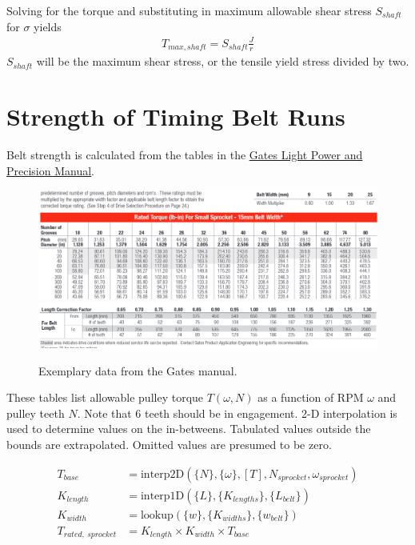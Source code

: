 \documentclass[10pt,letterpaper]{article}
\begin{document}
	Solving for the torque and substituting in maximum allowable shear stress $S_{shaft}$ for $\sigma$ yields
	\begin{align}
		T_{max,shaft} = S_{shaft} \frac{J}{r}
	\end{align}
	$S_{shaft}$ will be the maximum shear stress, or the tensile yield stress divided by two.

\section{Strength of Timing Belt Runs}
	Belt strength is calculated from the tables in the \href{https://www.gates.com/content/dam/gates/home/resources/resource-library/catalogs/light-power-and-precision-manual.pdf}{\underline{Gates Light Power and Precision Manual}}.

	\begin{figure}[H]
	\includegraphics[width=\textwidth]{beltrating_a.png}
	\includegraphics[width=\textwidth]{beltrating_b.png}
	\caption{Exemplary data from the Gates manual.}
	\end{figure}

	These tables list allowable pulley torque $T(\omega, N)$ as a function of RPM $\omega$ and pulley teeth $N$. Note that 6 teeth should be in engagement.
	2-D interpolation is used to determine values on the in-betweens.
	Tabulated values outside the bounds are extrapolated. Omitted values are presumed to be zero.

	\begin{align}
		T_{base} &= \text{interp2D}(\{N\}, \{\omega\}, [T], N_{sprocket}, \omega_{sprocket}) \\
		K_{length} &= \text{interp1D}(\{L\}, \{K_{lengths}\}, \{L_{belt}\}) \\
		K_{width} &= \text{lookup}(\{w\}, \{K_{widths}\}, \{w_{belt}\}) \\
		T_{rated,\ sprocket} &= K_{length} \times K_{width} \times T_{base}
	\end{align}
\end{document}
